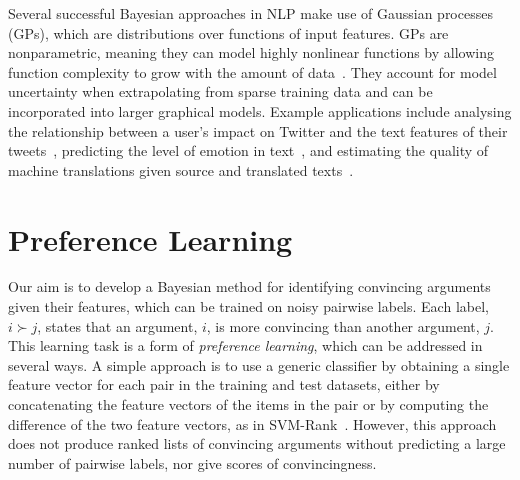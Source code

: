 Several successful Bayesian approaches in NLP make use of Gaussian processes (GPs), which are 
distributions over functions of input features. 
GPs are nonparametric, meaning they can model highly nonlinear functions by
allowing function complexity to grow with the amount of data~\cite{rasmussen_gaussian_2006}.
They account for model uncertainty when extrapolating from sparse training data
and can be incorporated into larger graphical models.
Example applications include analysing the relationship between a user's impact on Twitter 
and the text features of their tweets~\cite{lampos2014predicting}, 
predicting the level of emotion in text~\cite{beck2014joint},
and estimating the quality of machine translations given source and translated texts~\cite{cohn2013modelling}.

\section{Preference Learning}\label{sec:pref_learning}

Our aim is to develop a Bayesian method for identifying convincing arguments 
given their features, which can be trained on noisy pairwise labels.
Each label, $i \succ j$, states that an argument, $i$, is more convincing than another argument, $j$. 
This learning task is a form of \emph{preference learning}, which can be addressed in several ways.
A simple approach is to use a generic classifier by
obtaining a single feature vector for each pair in the training and test datasets,
either by concatenating the feature vectors of the items in the pair 
or by computing the difference of the two feature vectors, as in SVM-Rank~\cite{joachims2002optimizing}. 
However, this approach does not produce ranked lists of convincing arguments without predicting a large number of pairwise labels, nor give scores of convincingness. %

